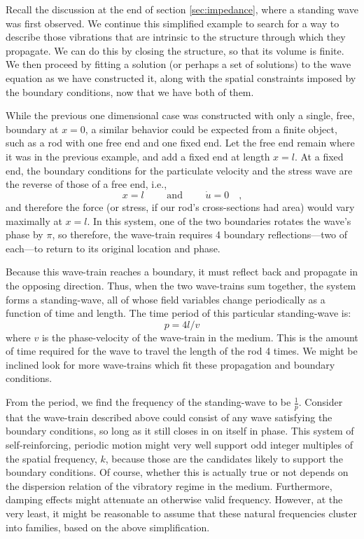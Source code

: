 \documentclass[a4paper,10pt]{report}
\numberwithin{equation}{section}
\begin{document}
Recall the discussion at the end of section \ref{sec:impedance}, where a standing wave was first observed. We continue this simplified example to search for a way to describe those vibrations that are intrinsic to the structure through which they propagate. We can do this by closing the structure, so that its volume is finite. We then proceed by fitting a solution (or perhaps a set of solutions) to the wave equation as we have constructed it, along with the spatial constraints imposed by the boundary conditions, now that we have both of them. 

While the previous one dimensional case was constructed with only a single, free, boundary at $x=0$, a similar behavior could be expected from a finite object, such as a rod with one free end and one fixed end. Let the free end remain where it was in the previous example, and add a fixed end at length $x=l$. At a fixed end, the boundary conditions for the particulate velocity and the stress wave are the reverse of those of a free end, i.e., 
\begin{equation*}
x=l \qquad \text{ and } \qquad \dot{u} = 0 \quad \text{,}
\end{equation*}
and therefore the force (or stress, if our rod's cross-sections had area) would vary maximally at $x=l$. In this system, one of the two boundaries rotates the wave's phase by $\pi$, so therefore, the wave-train requires 4 boundary reflections---two of each---to return to its original location and phase.

Because this wave-train reaches a boundary, it must reflect back and propagate in the opposing direction. Thus, when the two wave-trains sum together, the system forms a standing-wave, all of whose field variables change periodically as a function of time and length.\cite[p.~117]{Cremer1973} The time period of this particular standing-wave is:
\begin{equation}\label{0thmode}
p = 4l / v
\end{equation}
where $v$ is the phase-velocity of the wave-train in the medium. This is the amount of time required for the wave to travel the length of the rod 4 times. We might be inclined look for more wave-trains which fit these propagation and boundary conditions.\cite[p.117]{Cremer1973} 

From the period, we find the frequency of the standing-wave to be $\frac{1}{p}$. Consider that the wave-train described above could consist of any wave satisfying the boundary conditions, so long as it still closes in on itself in phase. This system of self-reinforcing, periodic motion might very well support odd integer multiples of the spatial frequency, $k$, because those are the candidates likely to support the boundary conditions. Of course, whether this is actually true or not depends on the dispersion relation of the vibratory regime in the medium. Furthermore, damping effects might attenuate an otherwise valid frequency. However, at the very least, it might be reasonable to assume that these natural frequencies cluster into families, based on the above simplification.\cite[p.~126]{Cremer1973}
\end{document}
